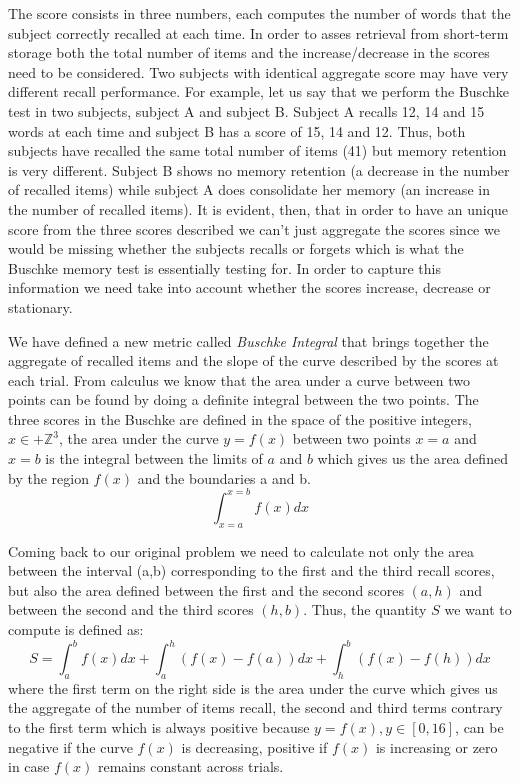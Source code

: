 \documentclass[11pt]{article}
\theoremstyle{definition}
\theoremstyle{remark}
\begin{document}
The score consists in three numbers, each computes the number of words that the subject correctly recalled at each time. In order to asses retrieval from short-term storage both the total number of items and the increase/decrease in the scores need to be considered. Two subjects with identical aggregate score may have very different recall performance. For example, let us say that we perform the Buschke test in two subjects, subject A and subject B. Subject A recalls 12, 14 and 15 words at each time and subject B has a score of 15, 14 and 12. Thus, both subjects have recalled the same total number of items (41) but memory retention is very different. Subject B shows no memory retention (a decrease in the number of recalled items) while subject A does consolidate her memory (an increase in the number of recalled items).
It is evident, then, that in order to have an unique score from the three scores described we can't just aggregate the scores since we would be missing whether the subjects recalls or forgets which is what the Buschke memory test is essentially testing for. In order to capture this information we need take into account whether the scores increase, decrease or stationary.

We have defined a new metric called \emph{Buschke Integral} that brings together the aggregate of recalled items and the slope of the curve described by the scores at each trial. 
From calculus we know that the area under a curve between two points can be found by doing a definite integral between the two points. 
The three scores in the Buschke are defined in the space of the positive integers, $x \in +\mathbb{Z}^3$, the area under the curve $y = f(x)$ between two points $x=a$ and $x=b$ is the integral between the limits of $a$ and $b$ which gives us the area defined by the region $f(x)$ and the boundaries a and b.
\begin{equation}
\int_{x=a}^{x=b}f(x)dx
\label{eq:defint}
\end{equation}
 
Coming back to our original problem we need to calculate not only the area between the interval (a,b) corresponding to the first and the third recall scores, but also the area defined between the first and the second scores $(a,h)$ and between the second and the third scores $(h,b)$.  
Thus, the quantity $S$ we want to compute is defined as:
\begin{equation}
S = \int_{a}^{b}f(x)dx + \int_{a}^{h}(f(x) - f(a))dx + \int_{h}^{b}(f(x)-f(h))dx
\label{eq:buchske}
\end{equation}
where the first term on the right side is the area under the curve which gives us the aggregate of the number of items recall, the second and third terms contrary to the first term which is always positive because $y =f(x), y \in [0,16]$, can be negative if the curve $f(x)$ is decreasing, positive if $f(x)$ is increasing or zero in case $f(x)$ remains constant across trials.
\end{document}
